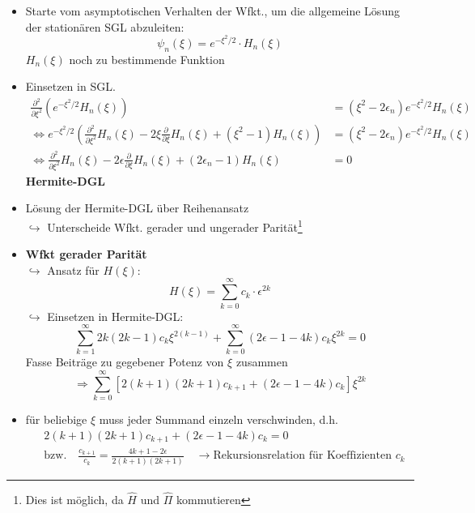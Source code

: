 \documentclass[10pt,article,colorback,accentcolor=tud9d]{scrartcl}
\begin{document}
\begin{itemize}
	\item Starte vom asymptotischen Verhalten der Wfkt., um die allgemeine Lösung der stationären SGL abzuleiten:
    \begin{equation}
    \psi_n(\xi)=e^{-\xi^2/2}\cdot H_n(\xi)
    \end{equation}
    $H_n(\xi)$ noch zu bestimmende Funktion
  \item Einsetzen in SGL.
    \begin{align}
      \frac{\partial^2}{\partial\xi^2}\left(e^{-\xi^2/2}H_n(\xi)\right)&=(\xi^2-2\epsilon_n)e^{-\xi^2/2}H_n(\xi)\\
      \Leftrightarrow e^{-\xi^2/2}\left(\frac{\partial^2}{\partial\xi^2}H_n(\xi)-2\xi\frac{\partial}{\partial\xi}H_n(\xi)+(\xi^2-1)H_n(\xi)\right)&=(\xi^2-2\epsilon_n)e^{-\xi^2/2}H_n(\xi)\\
      \Leftrightarrow \frac{\partial^2}{\partial\xi^2}H_n(\xi)-2\epsilon\frac{\partial}{\partial\xi}H_n(\xi)+(2\epsilon_n-1)H_n(\xi)&=0
    \end{align}
    \textbf{Hermite-DGL}
  \item Lösung der Hermite-DGL über Reihenansatz\\
    $\hookrightarrow$ Unterscheide Wfkt. gerader und ungerader Parität\footnote{Dies ist möglich, da $\hat{H}$ und $\hat{\Pi}$ kommutieren}
  \item \textbf{Wfkt gerader Parität}\\
    $\hookrightarrow$ Ansatz für $H(\xi)$:
    \begin{equation}
    H(\xi)=\sum^\infty_{k=0}c_k\cdot\epsilon^{2k}
    \end{equation}
    $\hookrightarrow$ Einsetzen in Hermite-DGL:
    \begin{equation}
    \sum_{k=1}^\infty 2k(2k-1)c_k\xi^{2(k-1)}+\sum_{k=0}^\infty(2\epsilon-1-4k)c_k\xi^{2k}=0
    \end{equation}
    Fasse Beiträge zu gegebener Potenz von $\xi$ zusammen
    \begin{equation}
    \Rightarrow \sum_{k=0}^\infty\left[2(k+1)(2k+1)c_{k+1}+(2\epsilon-1-4k)c_k\right]\xi^{2k}
    \end{equation}
  \item für beliebige $\xi$ muss jeder Summand einzeln verschwinden, d.h.
    \begin{align}
    &2(k+1)(2k+1)c_{k+1}+(2\epsilon-1-4k)c_k=0\\
    &\text{bzw.} \quad \frac{c_{k+1}}{c_k}=\frac{4k+1-2\epsilon}{2(k+1)(2k+1)}\quad\rightarrow\text{Rekursionsrelation für Koeffizienten $c_k$}

\end{align}
\end{itemize}
\end{document}
